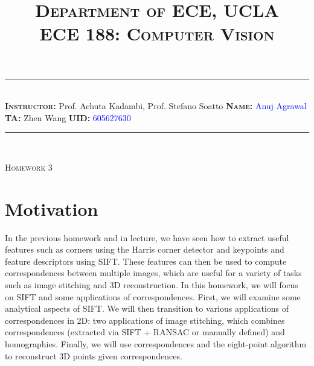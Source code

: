 \documentclass[answers]{exam}
\title{\normalfont \normalsize
\textsc{{Department of ECE, UCLA \\
ECE 188: Computer Vision}}
\date{\vspace{-12ex}}
}
\newcommand{\myinput}[1]{\textcolor{blue}{#1}}
\begin{document}
\maketitle
\rule{\linewidth}{0.8pt} \\[6pt] 
\noindent
\large\textbf{\textsc{Instructor:}} Prof. Achuta Kadambi, Prof. Stefano Soatto \hfill \large\textbf{\textsc{Name:}} \myinput{Anuj Agrawal}\\
\large\textbf{\textsc{TA:}} Zhen Wang \hfill 
\large\textbf{\textsc{UID:}} \myinput{605627630}
\rule{\linewidth}{0.8pt} \\[6pt] 

\begin{center}
{\textsc{Homework 3}} 
\end{center}


\begin{table}[h]
\centering
{}
\caption*{}
\label{}
\end{table}

\newpage

\section*{Motivation}

In the previous homework and in lecture, we have seen how to extract useful features such as corners using the Harris corner detector and keypoints and feature descriptors using SIFT. These features can then be used to compute correspondences between multiple images, which are useful for a variety of tasks such as image stitching and 3D reconstruction. In this homework, we will focus on SIFT and some applications of correspondences. First, we will examine some analytical aspects of SIFT. We will then transition to various applications of correspondences in 2D: two applications of image stitching, which combines correspondences (extracted via SIFT + RANSAC or manually defined) and homographies. Finally, we will use correspondences and the eight-point algorithm to reconstruct 3D points given correspondences. 
\end{document}
